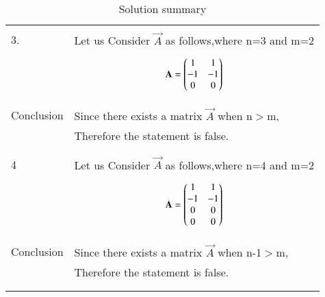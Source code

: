 \documentclass[journal,12pt]{IEEEtran}
\begin{document}
\begin{longtable}{|l|l|}
&\\
\hline
\pagebreak
\hline
&\\
3.&Let us Consider $\vec{A}$ as follows,where n=3 and m=2\\
&\parbox{6cm}{\begin{align}
    \mathbf{A}=\begin{pmatrix}1&1\\-1&-1\\0&0\end{pmatrix}
\end{align}}\\
\hline
&\\
Conclusion&Since there exists a matrix $\vec{A}$ when n$>$m,\\
&Therefore the statement is false.\\
&\\
\hline
&\\
4&Let us Consider $\vec{A}$ as follows,where n=4 and m=2\\
&\parbox{6cm}{\begin{align}
    \mathbf{A}=\begin{pmatrix}1&1\\-1&-1\\0&0\\0&0\end{pmatrix}
\end{align}}\\
\hline
&\\
Conclusion&Since there exists a matrix $\vec{A}$ when n-1$>$m,\\
&Therefore the statement is false.\\
&\\
\hline
\caption{Solution summary}
\label{table:2}
\end{longtable}
\end{document}
